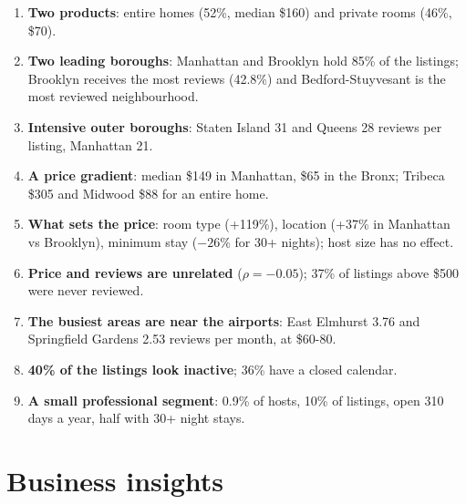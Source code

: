 \documentclass[12pt,a4paper]{article}
\begin{document}
\begin{enumerate}
\item \textbf{Two products}: entire homes (52\%, median \$160) and private rooms (46\%, \$70).
\item \textbf{Two leading boroughs}: Manhattan and Brooklyn hold 85\% of the listings; Brooklyn
receives the most reviews (42.8\%) and Bedford-Stuyvesant is the most reviewed neighbourhood.
\item \textbf{Intensive outer boroughs}: Staten Island 31 and Queens 28 reviews per listing, Manhattan 21.
\item \textbf{A price gradient}: median \$149 in Manhattan, \$65 in the Bronx; Tribeca \$305 and Midwood
\$88 for an entire home.
\item \textbf{What sets the price}: room type (+119\%), location (+37\% in Manhattan vs Brooklyn),
minimum stay ($-26\%$ for 30+ nights); host size has no effect.
\item \textbf{Price and reviews are unrelated} ($\rho = -0.05$); 37\% of listings above \$500 were never reviewed.
\item \textbf{The busiest areas are near the airports}: East Elmhurst 3.76 and Springfield Gardens 2.53
reviews per month, at \$60-80.
\item \textbf{40\% of the listings look inactive}; 36\% have a closed calendar.
\item \textbf{A small professional segment}: 0.9\% of hosts, 10\% of listings, open 310 days a year,
half with 30+ night stays.
\end{enumerate}

\section{Business insights}\label{sec:ins}
\end{document}
